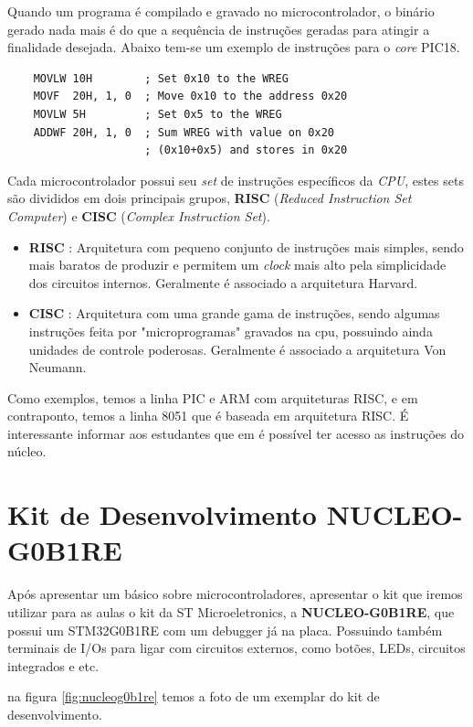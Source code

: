 \documentclass[12pt,a4paper]{report}
\begin{document}
Quando um programa é compilado e gravado no microcontrolador, o binário gerado nada mais é do que a sequência de instruções geradas para atingir a finalidade desejada. Abaixo tem-se um exemplo de instruções para o \textit{core} PIC18.

\begin{verbatim}
    MOVLW 10H        ; Set 0x10 to the WREG
    MOVF  20H, 1, 0  ; Move 0x10 to the address 0x20   
    MOVLW 5H         ; Set 0x5 to the WREG
    ADDWF 20H, 1, 0  ; Sum WREG with value on 0x20 
                     ; (0x10+0x5) and stores in 0x20
\end{verbatim}

Cada microcontrolador possui seu \textit{set} de instruções específicos da \textit{CPU}, estes sets são divididos em dois principais grupos, \textbf{RISC} (\textit{Reduced Instruction Set Computer}) e \textbf{CISC} (\textit{Complex Instruction Set}).

\begin{itemize}
    \item \textbf{RISC} : Arquitetura com pequeno conjunto de instruções mais simples, sendo mais baratos de produzir e permitem um \textit{clock} mais alto pela simplicidade dos circuitos internos. Geralmente é associado a arquitetura Harvard.
    \item \textbf{CISC} : Arquitetura com uma grande gama de instruções, sendo algumas instruções feita por "microprogramas" gravados na cpu, possuindo ainda unidades de controle poderosas. Geralmente é associado a arquitetura Von Neumann.
\end{itemize}

Como exemplos, temos a linha PIC e ARM com arquiteturas RISC, e em contraponto, temos a linha 8051 que é baseada em arquitetura RISC. É interessante informar aos estudantes que em \cite{ci:cortex_m0_iss} é possível ter acesso as instruções do núcleo.

\section{Kit de Desenvolvimento NUCLEO-G0B1RE}

Após apresentar um básico sobre microcontroladores, apresentar o kit que iremos utilizar para as aulas o kit da ST Microeletronics, a \textbf{NUCLEO-G0B1RE}, que possui um STM32G0B1RE com um debugger já na placa. Possuindo também terminais de I/Os para ligar com circuitos externos, como botões, LEDs, circuitos integrados e etc.

na figura \ref{fig:nucleog0b1re} temos a foto de um exemplar do kit de desenvolvimento.
\end{document}
